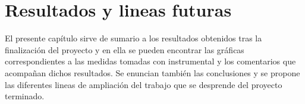 \chapter{Resultados y lineas futuras}

El presente capítulo sirve de sumario a los resultados obtenidos tras la finalización del proyecto y en ella se pueden encontrar
las gráficas correspondientes a las medidas tomadas con instrumental y los comentarios que acompañan dichos resultados. Se enuncian
también las conclusiones y se propone las diferentes lineas de ampliación del trabajo que se desprende del proyecto terminado.